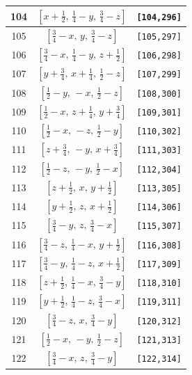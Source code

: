 \documentclass[fleqn,8pt]{jsarticle}
\begin{document}
\begin{longtable}{ccc}
104 & $\left[ x + \frac{1}{2},\, \frac{1}{4} - y,\, \frac{3}{4} - z \right]$ & {\tt [104,296]} \\ \hline
105 & $\left[ \frac{3}{4} - x,\, y,\, \frac{3}{4} - z \right]$ & {\tt [105,297]} \\ \hline
106 & $\left[ \frac{3}{4} - x,\, \frac{1}{4} - y,\, z + \frac{1}{2} \right]$ & {\tt [106,298]} \\ \hline
107 & $\left[ y + \frac{3}{4},\, x + \frac{1}{4},\, \frac{1}{2} - z \right]$ & {\tt [107,299]} \\ \hline
108 & $\left[ \frac{1}{2} - y,\, - x,\, \frac{1}{2} - z \right]$ & {\tt [108,300]} \\ \hline
109 & $\left[ \frac{1}{2} - x,\, z + \frac{1}{4},\, y + \frac{3}{4} \right]$ & {\tt [109,301]} \\ \hline
110 & $\left[ \frac{1}{2} - x,\, - z,\, \frac{1}{2} - y \right]$ & {\tt [110,302]} \\ \hline
111 & $\left[ z + \frac{3}{4},\, - y,\, x + \frac{3}{4} \right]$ & {\tt [111,303]} \\ \hline
112 & $\left[ \frac{1}{2} - z,\, - y,\, \frac{1}{2} - x \right]$ & {\tt [112,304]} \\ \hline
113 & $\left[ z + \frac{1}{2},\, x,\, y + \frac{1}{2} \right]$ & {\tt [113,305]} \\ \hline
114 & $\left[ y + \frac{1}{2},\, z,\, x + \frac{1}{2} \right]$ & {\tt [114,306]} \\ \hline
115 & $\left[ \frac{3}{4} - y,\, z,\, \frac{3}{4} - x \right]$ & {\tt [115,307]} \\ \hline
116 & $\left[ \frac{3}{4} - z,\, \frac{1}{4} - x,\, y + \frac{1}{2} \right]$ & {\tt [116,308]} \\ \hline
117 & $\left[ \frac{3}{4} - y,\, \frac{1}{4} - z,\, x + \frac{1}{2} \right]$ & {\tt [117,309]} \\ \hline
118 & $\left[ z + \frac{1}{2},\, \frac{1}{4} - x,\, \frac{3}{4} - y \right]$ & {\tt [118,310]} \\ \hline
119 & $\left[ y + \frac{1}{2},\, \frac{1}{4} - z,\, \frac{3}{4} - x \right]$ & {\tt [119,311]} \\ \hline
120 & $\left[ \frac{3}{4} - z,\, x,\, \frac{3}{4} - y \right]$ & {\tt [120,312]} \\ \hline
121 & $\left[ \frac{1}{2} - x,\, - y,\, \frac{1}{2} - z \right]$ & {\tt [121,313]} \\ \hline
122 & $\left[ \frac{3}{4} - x,\, z,\, \frac{3}{4} - y \right]$ & {\tt [122,314]} \\ \hline

\end{longtable}
\end{document}
